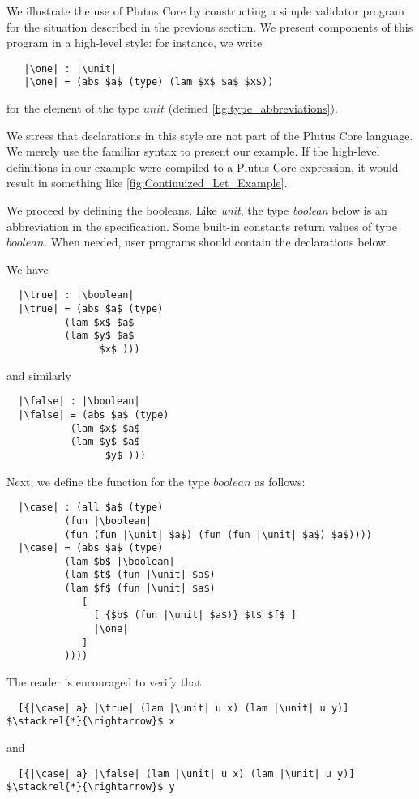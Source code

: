 \documentclass[../plutus-core-specification.tex]{subfiles}
\begin{document}
We illustrate the use of Plutus Core by constructing a simple
validator program for the situation described in the previous
section. We present components of this program in a high-level style:
for instance, we write
\begin{lstlisting}
   |\one| : |\unit|
   |\one| = (abs $a$ (type) (lam $x$ $a$ $x$))
\end{lstlisting}
for the element of the type $unit$ (defined \cref{fig:type_abbreviations}).

We stress that declarations in this style are not part of the Plutus
Core language. We merely use the familiar syntax to present our
example. If the high-level definitions in our example were compiled to
a Plutus Core expression, it would result in something like
\cref{fig:Continuized_Let_Example}.

We proceed by defining the booleans. Like \textit{unit}, the type \textit{boolean}
below is an abbreviation in the specification. Some built-in constants
return values of type $boolean$. When needed, user programs should
contain the declarations below.


\noindent We have

\begin{lstlisting}
  |\true| : |\boolean|
  |\true| = (abs $a$ (type)
          (lam $x$ $a$
          (lam $y$ $a$
                $x$ )))
\end{lstlisting}
and similarly
\begin{lstlisting}
  |\false| : |\boolean|
  |\false| = (abs $a$ (type)
           (lam $x$ $a$
           (lam $y$ $a$
                 $y$ )))
\end{lstlisting}

\noindent Next, we define the \case{} function for the type $boolean$ as follows:
\begin{lstlisting}
  |\case| : (all $a$ (type)
          (fun |\boolean|
          (fun (fun |\unit| $a$) (fun (fun |\unit| $a$) $a$))))
  |\case| = (abs $a$ (type)
          (lam $b$ |\boolean|
          (lam $t$ (fun |\unit| $a$)
          (lam $f$ (fun |\unit| $a$)
             [
               [ {$b$ (fun |\unit| $a$)} $t$ $f$ ]
               |\one|
             ]
          ))))
\end{lstlisting}
The reader is encouraged to verify that
\begin{lstlisting}
  [{|\case| a} |\true| (lam |\unit| u x) (lam |\unit| u y)] $\stackrel{*}{\rightarrow}$ x
\end{lstlisting}
and
\begin{lstlisting}
  [{|\case| a} |\false| (lam |\unit| u x) (lam |\unit| u y)] $\stackrel{*}{\rightarrow}$ y
\end{lstlisting}
\end{document}

